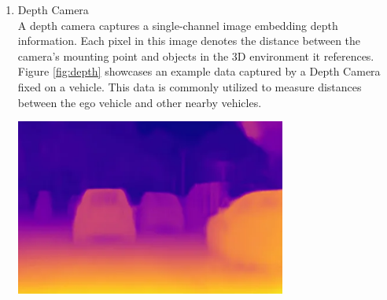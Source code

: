 \documentclass[12pt,twoside,a4paper,parskip]{scrbook} %
\begin{document}
\begin{enumerate}[label=\alph*.]
    \item Depth Camera \\
    A depth camera captures a single-channel image embedding depth information. Each pixel in this image denotes the distance between the camera's mounting point and objects in the 3D environment it references. Figure \ref{fig:depth} showcases an example data captured by a Depth Camera fixed on a vehicle. This data is commonly utilized to measure distances between the ego vehicle and other nearby vehicles.
    \begin{minipage}[t]{\linewidth}
        \centering
        \includegraphics[width=0.70\textwidth]{Images/Dethcam.png}
        \label{fig:depth}
        \vspace{-\baselineskip} %
    \end{minipage}
    \hfill
    

\end{enumerate}
\end{document}

